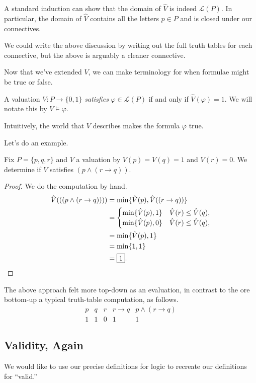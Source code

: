 A standard induction can show that the domain of $\hat V$ is indeed $\mathcal L(P)$. In particular, the domain of $\hat V$ contains all the letters $p\in P$ and is closed under our connectives.
\begin{remark}
	We could write the above discussion by writing out the full truth tables for each connective, but the above is arguably a cleaner connective.
\end{remark}
Now that we've extended $V$, we can make terminology for when formulae might be true or false.
\begin{definition}[Satisfies]
	A valuation $V:P\to\{0,1\}$ \textit{satisfies} $\varphi\in\mathcal L(P)$ if and only if $\hat V(\varphi)=1$. We will notate this by $V\models\varphi$.
\end{definition}
Intuitively, the world that $V$ describes makes the formula $\varphi$ true.

Let's do an example.
\begin{exe}
	Fix $P=\{p,q,r\}$ and $V$ a valuation by $V(p)=V(q)=1$ and $V(r)=0$. We determine if $V$ satisfies $(p\land(r\to q))$.
\end{exe}
\begin{proof}
	We do the computation by hand.
	\begin{align*}
		\hat V(((p\land(r\to q)))) &= \min\{\hat V(p),\hat V((r\to q))\} \\
		&= \begin{cases}
			\min\{\hat V(p),1\} & \hat V(r)\le\hat V(q), \\
			\min\{\hat V(p),0\} & \hat V(r)\le\hat V(q), \\
		\end{cases} \\
		&= \min\{\hat V(p),1\} \\
		&= \min\{1,1\} \\
		&= \boxed1.\qedhere
	\end{align*}
\end{proof}
The above approach felt more top-down as an evaluation, in contrast to the ore bottom-up a typical truth-table computation, as follows.
\[\begin{array}{c|c|c||c|c}
	p & q & r & r\to q & p\land(r\to q) \\\hline
	1 & 1 & 0 & 1 & 1
\end{array}\]

\subsection{Validity, Again}
We would like to use our precise definitions for logic to recreate our definitions for ``valid.''

